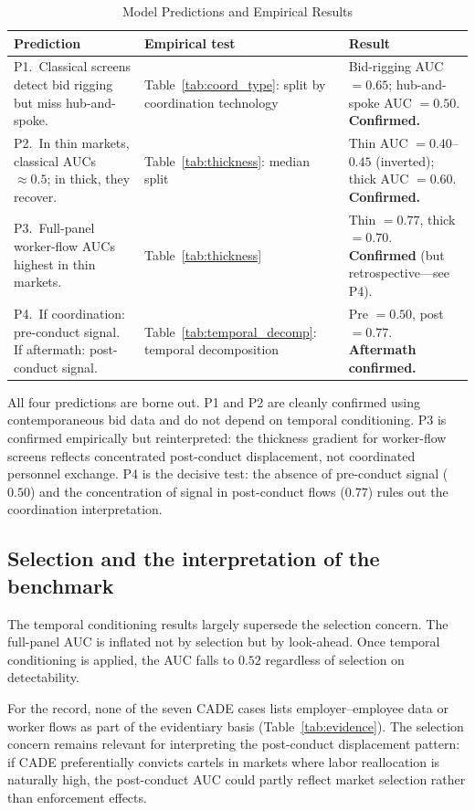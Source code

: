\begin{table}[htbp]
\centering
\caption{Model Predictions and Empirical Results}\label{tab:predictions}
\begin{tabular}{p{4.5cm}p{4cm}p{4.5cm}}
\toprule
Prediction & Empirical test & Result \\
\midrule
P1.\ Classical screens detect bid rigging but miss hub-and-spoke. & Table~\ref{tab:coord_type}: split by coordination technology & Bid-rigging AUC $= 0.65$; hub-and-spoke AUC $= 0.50$. \textbf{Confirmed.} \\[6pt]
P2.\ In thin markets, classical AUCs $\approx 0.5$; in thick, they recover. & Table~\ref{tab:thickness}: median split & Thin AUC $= 0.40$--$0.45$ (inverted); thick AUC $= 0.60$. \textbf{Confirmed.} \\[6pt]
P3.\ Full-panel worker-flow AUCs highest in thin markets. & Table~\ref{tab:thickness} & Thin $= 0.77$, thick $= 0.70$. \textbf{Confirmed} (but retrospective---see P4). \\[6pt]
P4.\ If coordination: pre-conduct signal. If aftermath: post-conduct signal. & Table~\ref{tab:temporal_decomp}: temporal decomposition & Pre $= 0.50$, post $= 0.77$. \textbf{Aftermath confirmed.} \\
\bottomrule
\end{tabular}
\end{table}

All four predictions are borne out. P1 and P2 are cleanly confirmed using contemporaneous bid data and do not depend on temporal conditioning. P3 is confirmed empirically but reinterpreted: the thickness gradient for worker-flow screens reflects concentrated post-conduct displacement, not coordinated personnel exchange. P4 is the decisive test: the absence of pre-conduct signal ($0.50$) and the concentration of signal in post-conduct flows ($0.77$) rules out the coordination interpretation.

\subsection{Selection and the interpretation of the benchmark}\label{sec:selection}

The temporal conditioning results largely supersede the selection concern. The full-panel AUC is inflated not by selection but by look-ahead. Once temporal conditioning is applied, the AUC falls to $0.52$ regardless of selection on detectability.

For the record, none of the seven CADE cases lists employer--employee data or worker flows as part of the evidentiary basis (Table~\ref{tab:evidence}). The selection concern remains relevant for interpreting the post-conduct displacement pattern: if CADE preferentially convicts cartels in markets where labor reallocation is naturally high, the post-conduct AUC could partly reflect market selection rather than enforcement effects.

